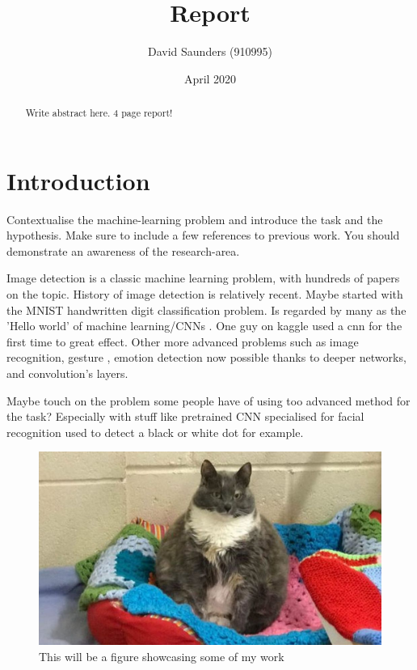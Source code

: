 \documentclass{article}
\title{Report}
\author{David Saunders (910995)}
\date{April 2020}
\begin{document}
\maketitle

\begin{abstract} 
    Write abstract here. 4 page report!
\end{abstract}

\tableofcontents

\section{Introduction}

Contextualise the machine-learning problem and introduce the
task and the hypothesis. Make sure to include a few references to previous
work. You should demonstrate an awareness of the research-area.

Image detection is a classic machine learning problem, with hundreds of papers on the topic. 
History of image detection is relatively recent.
Maybe started with the MNIST handwritten digit classification problem.
Is regarded by many as the 'Hello world' of machine learning/CNNs \cite{tensorflow_2020}.
One guy on kaggle used a cnn for the first time to great effect.
Other more advanced problems such as image recognition, gesture
    , emotion detection now possible thanks to deeper networks, and convolution's layers.


Maybe touch on the problem some people have of using too advanced method for the task?
Especially with stuff like pretrained CNN specialised for facial recognition used to detect a black or white dot for example.


\begin{figure}[ht]
    \centering
    \includegraphics[scale=0.35]{Test.JPG}
    \caption{This will be a figure showcasing some of my work}
    \label{fig:test}
\end{figure}
\end{document}
